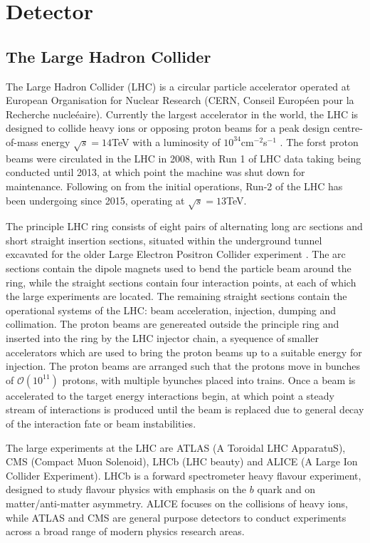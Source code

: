 \chapter{Detector}\label{c:Det}

\section{The Large Hadron Collider}

	The Large Hadron Collider (LHC) is a circular particle accelerator operated at European Organisation for Nuclear Research (CERN, Conseil Europ\'{e}en pour la Recherche nucle\'{e}aire). Currently the largest accelerator in the world, the LHC is designed to collide heavy ions or opposing proton beams for a peak design centre-of-mass energy $\sqrt{s}=14$TeV with a luminosity of $10^{34}$cm$^{-2}$s$^{-1}$ \cite{lhc}. The forst proton beams were circulated in the LHC in 2008, with Run 1 of LHC data taking being conducted until 2013, at which point the machine was shut down for maintenance. Following on from the initial operations, Run-2 of the LHC has been undergoing since 2015, operating at $\sqrt{s}=13$TeV. 

	The principle LHC ring consists of eight pairs of alternating long arc sections and short straight insertion sections, situated within the underground tunnel excavated for the older Large Electron Positron Collider experiment \cite{lep1, lep2}. The arc sections contain the dipole magnets used to bend the particle beam around the ring, while the straight sections contain four interaction points, at each of which the large experiments are located. The remaining straight sections contain the operational systems of the LHC: beam acceleration, injection,  dumping and collimation. The proton beams are genereated outside the principle ring and inserted into the ring by the LHC injector chain, a syequence of smaller accelerators which are used to bring the proton beams up to a suitable energy for injection. The proton beams are arranged such that the protons move in bunches of $\mathcal{O}(10^{11})$ protons, with multiple byunches placed into trains. Once a beam is accelerated to the target energy interactions begin, at which point a steady stream of interactions is produced until the beam is replaced due to general decay of the interaction fate or beam instabilities.

	The large experiments at the LHC are ATLAS (A Toroidal LHC ApparatuS), CMS (Compact Muon Solenoid), LHCb (LHC beauty) and ALICE (A Large Ion Collider Experiment). LHCb is a forward spectrometer heavy flavour experiment, designed to study flavour physics with emphasis on the $b$ quark and on matter/anti-matter asymmetry. ALICE focuses on the collisions of heavy ions, while ATLAS and CMS are general purpose detectors to conduct experiments across a broad range of modern physics research areas.

